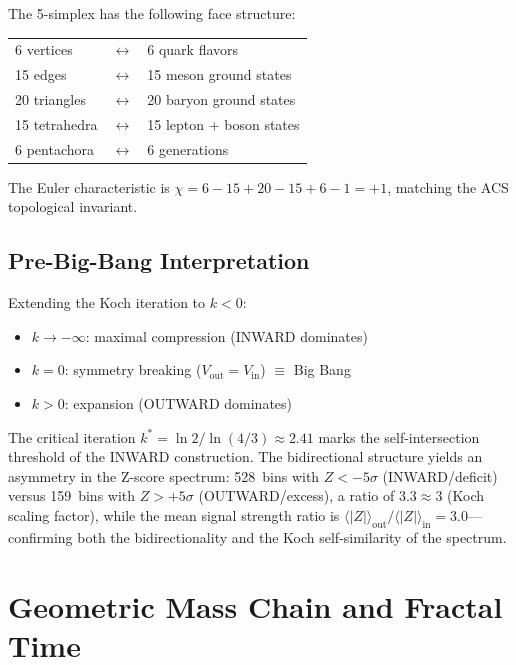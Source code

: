 \documentclass[twocolumn,showpacs,preprintnumbers,amsmath,amssymb,prl]{revtex4-2}
\begin{document}
The 5-simplex has the following face structure:
\begin{center}
\begin{tabular}{lcl}
6 vertices   & $\longleftrightarrow$ & 6 quark flavors \\
15 edges     & $\longleftrightarrow$ & 15 meson ground states \\
20 triangles & $\longleftrightarrow$ & 20 baryon ground states \\
15 tetrahedra& $\longleftrightarrow$ & 15 lepton + boson states \\
6 pentachora & $\longleftrightarrow$ & 6 generations \\
\end{tabular}
\end{center}
The Euler characteristic is $\chi = 6 - 15 + 20 - 15 + 6 - 1 = +1$,
matching the ACS topological invariant.

\subsection{Pre-Big-Bang Interpretation}

Extending the Koch iteration to $k < 0$:
\begin{itemize}
    \item $k \to -\infty$: maximal compression (INWARD dominates)
    \item $k = 0$: symmetry breaking ($V_{\text{out}} = V_{\text{in}}$) $\equiv$ Big Bang
    \item $k > 0$: expansion (OUTWARD dominates)
\end{itemize}
The critical iteration $k^* = \ln 2/\ln(4/3) \approx 2.41$ marks the
self-intersection threshold of the INWARD construction. The bidirectional
structure yields an asymmetry in the Z-score spectrum: 528~bins with
$Z < -5\sigma$ (INWARD/deficit) versus 159~bins with $Z > +5\sigma$
(OUTWARD/excess), a ratio of $3.3 \approx 3$ (Koch scaling factor),
while the mean signal strength ratio is $\langle|Z|\rangle_{\text{out}} /
\langle|Z|\rangle_{\text{in}} = 3.0$---confirming both the
bidirectionality and the Koch self-similarity of the spectrum.

\section{Geometric Mass Chain and Fractal Time}
\end{document}
